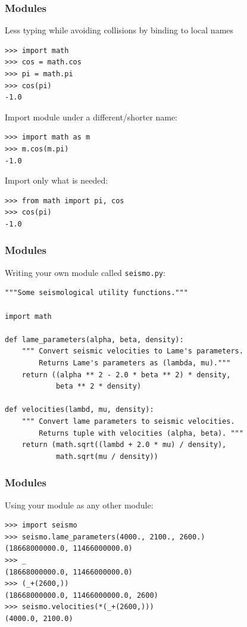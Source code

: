 \begin{frame}[fragile]
\frametitle{Modules}
Less typing while avoiding collisions by binding to local names
\begin{myColorBox}{0.9}{}
\begin{verbatim}
>>> import math
>>> cos = math.cos
>>> pi = math.pi
>>> cos(pi)
-1.0
\end{verbatim}
\end{myColorBox}

Import module under a different/shorter name:
\begin{myColorBox}{0.9}{}
\begin{verbatim}
>>> import math as m
>>> m.cos(m.pi)
-1.0
\end{verbatim}
\end{myColorBox}

Import only what is needed:
\begin{myColorBox}{0.9}{}
\begin{verbatim}
>>> from math import pi, cos
>>> cos(pi)
-1.0
\end{verbatim}
\end{myColorBox}
\end{frame}

\begin{frame}[fragile]
\frametitle{Modules}
Writing your own module called \verb#seismo.py#:
\begin{verbatim}
"""Some seismological utility functions."""

import math

def lame_parameters(alpha, beta, density):
    """ Convert seismic velocities to Lame's parameters.
        Returns Lame's parameters as (lambda, mu)."""
    return ((alpha ** 2 - 2.0 * beta ** 2) * density,
            beta ** 2 * density)

def velocities(lambd, mu, density):
    """ Convert lame parameters to seismic velocities.
        Returns tuple with velocities (alpha, beta). """
    return (math.sqrt((lambd + 2.0 * mu) / density),
            math.sqrt(mu / density))
\end{verbatim}
\end{frame}

\begin{frame}[fragile]
\frametitle{Modules}
Using your module as any other module:
\begin{myColorBox}{0.9}{}
\begin{verbatim}
>>> import seismo
>>> seismo.lame_parameters(4000., 2100., 2600.)
(18668000000.0, 11466000000.0)
>>> _
(18668000000.0, 11466000000.0)
>>> (_+(2600,))
(18668000000.0, 11466000000.0, 2600)
>>> seismo.velocities(*(_+(2600,)))
(4000.0, 2100.0)
\end{verbatim}
\end{myColorBox}
\end{frame}


